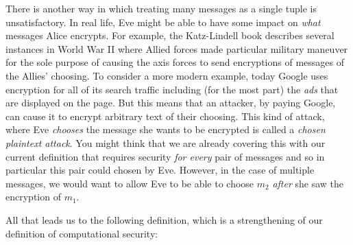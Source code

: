 There is another way in which treating many messages as a single tuple
is unsatisfactory. In real life, Eve might be able to have some impact
on \emph{what} messages Alice encrypts. For example, the Katz-Lindell
book describes several instances in World War II where Allied forces
made particular military maneuver for the sole purpose of causing the
axis forces to send encryptions of messages of the Allies' choosing. To
consider a more modern example, today Google uses encryption for all of
its search traffic including (for the most part) the \emph{ads} that are
displayed on the page. But this means that an attacker, by paying
Google, can cause it to encrypt arbitrary text of their choosing. This
kind of attack, where Eve \emph{chooses} the message she wants to be
encrypted is called a \emph{chosen plaintext attack}. You might think
that we are already covering this with our current definition that
requires security \emph{for every} pair of messages and so in particular
this pair could chosen by Eve. However, in the case of multiple
messages, we would want to allow Eve to be able to choose \(m_2\)
\emph{after} she saw the encryption of \(m_1\).

All that leads us to the following definition, which is a strengthening
of our definition of computational security:

\hypertarget{cpasecuredef}{}



